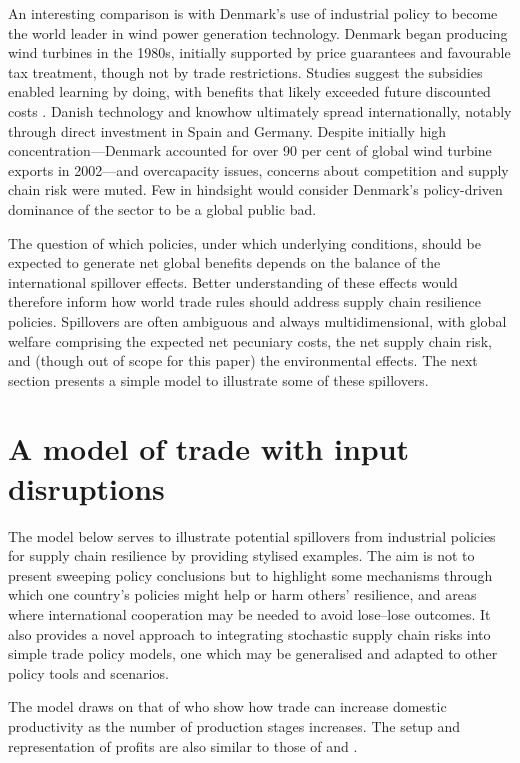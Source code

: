 \documentclass{article}
\begin{document}
An interesting comparison is with Denmark's use of industrial policy to become the world leader in wind power generation technology. Denmark began producing wind turbines in the 1980s, initially supported by price guarantees and favourable tax treatment, though not by trade restrictions. Studies suggest the subsidies enabled learning by doing, with benefits that likely exceeded future discounted costs \parencite{hansen_establishment_2003}. Danish technology and knowhow ultimately spread internationally, notably through direct investment in Spain and Germany. Despite initially high concentration---Denmark accounted for over 90 per cent of global wind turbine exports in 2002---and overcapacity issues, concerns about competition and supply chain risk were muted. Few in hindsight would consider Denmark's policy-driven dominance of the sector to be a global public bad.

The question of which policies, under which underlying conditions, should be expected to generate net global benefits depends on the balance of the international spillover effects. Better understanding of these effects would therefore inform how world trade rules should address supply chain resilience policies. Spillovers are often ambiguous and always multidimensional, with global welfare comprising the expected net pecuniary costs, the net supply chain risk, and (though out of scope for this paper) the environmental effects. The next section presents a simple model to illustrate some of these spillovers.

\section{A model of trade with input disruptions}

The model below serves to illustrate potential spillovers from industrial policies for supply chain resilience by providing stylised examples. The aim is not to present sweeping policy conclusions but to highlight some mechanisms through which one country's policies might help or harm others' resilience, and areas where international cooperation may be needed to avoid lose--lose outcomes. It also provides a novel approach to integrating stochastic supply chain risks into simple trade policy models, one which may be generalised and adapted to other policy tools and scenarios.

The model draws on that of \textcite{melitz_missing_2014} who show how trade can increase domestic productivity as the number of production stages increases. The setup and representation of profits are also similar to those of \textcite{venables_trade_1987} and \textcite{bagwell_design_2016}.
\end{document}
